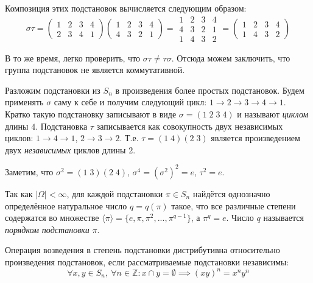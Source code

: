 Композиция этих подстановок вычисляется следующим образом:
\begin{equation*}
    \sigma\tau
    =
    \begin{pmatrix}
        1&2&3&4\\
        2&3&4&1
    \end{pmatrix}
    \begin{pmatrix}
        1&2&3&4\\
        4&3&2&1
    \end{pmatrix}
    =
    \begin{matrix}
        1&2&3&4\\
        4&3&2&1\\
        1&4&3&2
    \end{matrix}
    =
    \begin{pmatrix}
        1&2&3&4\\
        1&4&3&2
    \end{pmatrix}
\end{equation*}

В то же время, легко проверить, что $\sigma\tau \ne \tau\sigma$. Отсюда можем заключить, что группа подстановок не является коммутативной.

Разложим подстановки из $S_n$ в произведения более простых подстановок. Будем применять $\sigma$ саму к себе и получим следующий цикл: $1\to2\to3\to4\to1$. Кратко такую подстановку записывают в виде $\sigma=(1\;2\;3\;4)$ и называют \textit{циклом} длины $4$. Подстановка $\tau$ записывается как совокупность двух независимых циклов: $1\to4\to1$, $2\to3\to2$. Т.е. $\tau=(1\;4)(2\;3)$ является произведением двух \textit{независимых} циклов длины 2.

Заметим, что $\sigma^2=(1\;3)(2\;4)$, $\sigma^4=(\sigma^2)^2=e$, $\tau^2=e$.

\begin{definition}
    Так как $|\Omega|<\infty$, для каждой подстановки $\pi\in S_n$ найдётся однозначно определённое натуральное число $q=q(\pi)$ такое, что все различные степени содержатся во множестве $\langle \pi \rangle=\{e,\pi,\pi^2,...,\pi^{q-1}\}$, а $\pi^q=e$. Число $q$ называется \textit{порядком подстановки} $\pi$.
\end{definition}

\begin{theorem}
    Операция возведения в степень подстановки дистрибутивна относительно произведения подстановок, если рассматриваемые подстановки независимы:
    \begin{equation*}
        \forall x,y \in S_n ,\ \forall n\in \mathbb{Z}: x \cap y = \emptyset \implies (xy)^n=x^n y^n
    \end{equation*}
\end{theorem}

